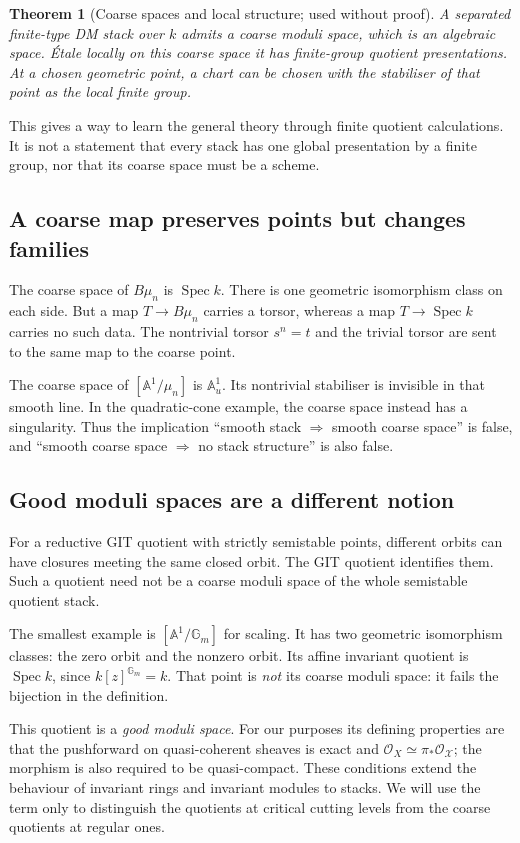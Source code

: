 \documentclass[11pt,a4paper]{article}
\numberwithin{equation}{section}
\newtheorem{theorem}[proposition]{Theorem}
\theoremstyle{definition}
\newcommand{\A}{\mathbb A}
\newcommand{\Gm}{\mathbb G_m}
\newcommand{\OO}{\mathcal O}
\newcommand{\cX}{\mathcal X}
\newcommand{\Spec}{\operatorname{Spec}}
\begin{document}
\begin{theorem}[Coarse spaces and local structure; used without proof]
A separated finite-type DM stack over $k$ admits a coarse moduli space,
which is an algebraic space. Étale locally on this coarse space it has
finite-group quotient presentations. At a chosen geometric point, a chart
can be chosen with the stabiliser of that point as the local finite group.
\end{theorem}

This gives a way to learn the general theory through finite quotient
calculations. It is not a statement that every stack has one global
presentation by a finite group, nor that its coarse space must be a scheme.

\subsection{A coarse map preserves points but changes families}
The coarse space of $B\mu_n$ is $\Spec k$. There is one geometric
isomorphism class on each side. But a map $T\to B\mu_n$ carries a torsor,
whereas a map $T\to\Spec k$ carries no such data. The nontrivial torsor
$s^n=t$ and the trivial torsor are sent to the same map to the coarse point.

The coarse space of $[\A^1/\mu_n]$ is $\A^1_u$. Its nontrivial stabiliser
is invisible in that smooth line. In the quadratic-cone example, the coarse
space instead has a singularity. Thus the implication
``smooth stack $\Rightarrow$ smooth coarse space'' is false, and
``smooth coarse space $\Rightarrow$ no stack structure'' is also false.

\subsection{Good moduli spaces are a different notion}
For a reductive GIT quotient with strictly semistable points, different
orbits can have closures meeting the same closed orbit. The GIT quotient
identifies them. Such a quotient need not be a coarse moduli space of the
whole semistable quotient stack.

The smallest example is $[\A^1/\Gm]$ for scaling. It has two geometric
isomorphism classes: the zero orbit and the nonzero orbit. Its affine
invariant quotient is $\Spec k$, since $k[z]^{\Gm}=k$. That point is
\emph{not} its coarse moduli space: it fails the bijection in the definition.

This quotient is a \emph{good moduli space}. For our purposes its defining
properties are that the pushforward on quasi-coherent sheaves is exact and
$\OO_X\simeq\pi_*\OO_{\cX}$; the morphism is also required to be
quasi-compact. These conditions extend the behaviour of invariant rings and
invariant modules to stacks. We will use the term only to distinguish the
quotients at critical cutting levels from the coarse quotients at regular ones.
\end{document}
